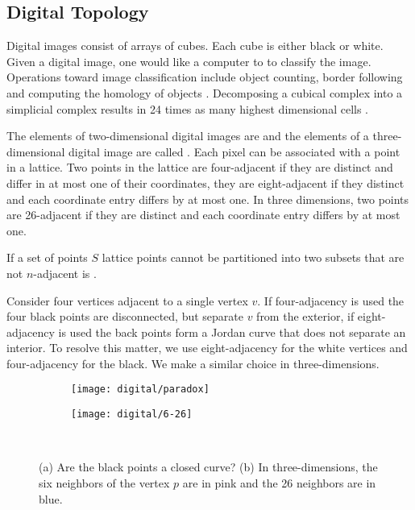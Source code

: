 \subsection{Digital Topology}
\label{sec:digital-topology}

Digital images consist of arrays of cubes.
Each cube is either black or white.
Given a digital image, one would like 
a computer to to classify the image.
Operations toward image classification include
object counting, border following and computing 
the homology of objects \cite{kong_digital_1989}.
Decomposing a cubical complex into a simplicial complex
results in 24 times as many highest dimensional cells \cite{Kaczynski2003}.


The elements of two-dimensional digital images
are  and the elements of a three-dimensional
digital image are called .
Each pixel can be associated with a point in a lattice.
Two points in the lattice are four-adjacent if
they are  distinct and differ in at most one of their
coordinates, they are eight-adjacent
if they distinct and each coordinate entry differs by at most one.
In three dimensions, two points
are 26-adjacent if they are distinct and each coordinate 
entry differs by at most one.

If a set of points $S$ lattice points cannot be
partitioned into two subsets that are not
$n$-adjacent is .

Consider four vertices adjacent to a single vertex $v$.
If four-adjacency is used the four black points are disconnected,
but separate $v$ from the exterior, if eight-adjacency is used
the back points form a Jordan curve that does not separate
an interior. To resolve this matter, we use eight-adjacency
for the white vertices and four-adjacency for the black.
We make a similar choice in three-dimensions.

\begin{figure}[htb]
        \centering
        \begin{subfigure}[b]{0.35\textwidth}
        \texttt{[image: digital/paradox]}
        \caption{}
          \label{fig:paradox}
        \end{subfigure}
          \hspace{.0cm}
         \begin{subfigure}[b]{0.40\textwidth}
        \texttt{[image: digital/6-26]}
        \caption{}
        \label{fig:6-26}
        \end{subfigure}\\
		\caption{(a) Are the black points a closed curve? (b) In three-dimensions,
		the six neighbors of the vertex $p$ are in pink and the 26 neighbors are in
		blue. 
		\label{fig:adjacency}}
\end{figure}

